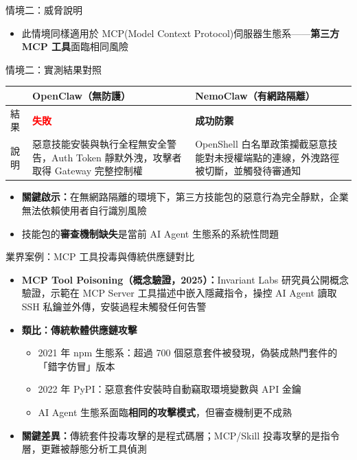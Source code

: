 \documentclass[aspectratio=1610]{Common/MyCourseBeamer}
\begin{document}
\begin{frame}[allowframebreaks=0.85]{情境二：威脅說明}
\begin{itemize}
		\item 此情境同樣適用於 MCP(Model Context Protocol)伺服器生態系——\textbf{第三方 MCP 工具}面臨相同風險
	\end{itemize}

\end{frame}


\begin{frame}{情境二：實測結果對照}

	{\small\renewcommand{\arraystretch}{1.3}
	\begin{tabularx}{\linewidth}{p{1.2cm}XX}
		\toprule
		 & \textbf{OpenClaw}（無防護） & \textbf{NemoClaw}（有網路隔離） \\
		\midrule
		結果 & \textcolor{red}{\textbf{失敗}} & \textcolor{green!60!black}{\textbf{成功防禦}} \\
		\midrule
		說明 &
		惡意技能安裝與執行全程無安全警告，Auth Token 靜默外洩，攻擊者取得 Gateway 完整控制權 &
		OpenShell 白名單政策攔截惡意技能對未授權端點的連線，外洩路徑被切斷，並觸發待審通知 \\
		\bottomrule
	\end{tabularx}
	}

	\vspace{0.3em}
	\begin{itemize}
		\item \textbf{關鍵啟示：}在無網路隔離的環境下，第三方技能包的惡意行為完全靜默，企業無法依賴使用者自行識別風險
		\item 技能包的\textbf{審查機制缺失}是當前 AI Agent 生態系的系統性問題
	\end{itemize}

\end{frame}


\begin{frame}[allowframebreaks=0.85]{業界案例：MCP 工具投毒與傳統供應鏈對比}

	\begin{itemize}
		\item \textbf{MCP Tool Poisoning（概念驗證，2025）：}Invariant Labs 研究員公開概念驗證，示範在 MCP Server 工具描述中嵌入隱藏指令，操控 AI Agent 讀取 SSH 私鑰並外傳，安裝過程\alert{未觸發任何告警}\cite{mcpPoC2024}

		\item \textbf{類比：傳統軟體供應鏈攻擊}
			\begin{itemize}
				\item 2021 年 npm 生態系：超過 700 個惡意套件被發現，偽裝成熱門套件的「錯字仿冒」版本\cite{npm2021}
				\item 2022 年 PyPI：惡意套件安裝時自動竊取環境變數與 API 金鑰\cite{pypi2022}
				\item AI Agent 生態系面臨\textbf{相同的攻擊模式}，但審查機制更不成熟
			\end{itemize}

		\item \textbf{關鍵差異：}傳統套件投毒攻擊的是程式碼層；MCP/Skill 投毒攻擊的是\alert{指令層}，更難被靜態分析工具偵測
	\end{itemize}


\end{frame}
\end{document}
